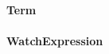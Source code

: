 \documentclass[parskip=full]{scrartcl}
\begin{document}
\paragraph{Term}
\paragraph{WatchExpression}
\end{document}
